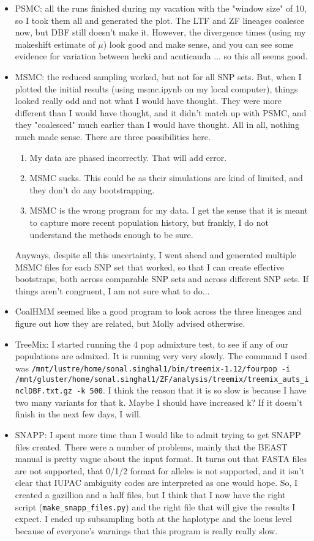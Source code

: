 \documentclass[idxtotoc,hyperref,openany,oneside]{labbook} %
\begin{document}
\begin{itemize}
\item PSMC: all the runs finished during my vacation with the "window size" of 10, so I took them all and generated the plot. The LTF and ZF lineages coalesce now, but DBF still doesn't make it. However, the divergence times (using my makeshift estimate of $\mu$) look good and make sense, and you can see some evidence for variation between hecki and acuticauda ... so this all seems good.
\item MSMC: the reduced sampling worked, but not for all SNP sets. But, when I plotted the initial results (using msmc.ipynb on my local computer), things looked really odd and not what I would have thought. They were more different than I would have thought, and it didn't match up with PSMC, and they "coalesced" much earlier than I would have thought. All in all, nothing much made sense. There are three possibilities here.
\begin{enumerate}
\item My data are phased incorrectly. That will add error.
\item MSMC sucks. This could be as their simulations are kind of limited, and they don't do any bootstrapping.
\item MSMC is the wrong program for my data. I get the sense that it is meant to capture more recent population history, but frankly, I do not understand the methods enough to be sure.
\end{enumerate}
Anyways, despite all this uncertainty, I went ahead and generated multiple MSMC files for each SNP set that worked, so that I can create effective bootstraps, both across comparable SNP sets and across different SNP sets. If things aren't congruent, I am not sure what to do...
\item CoalHMM seemed like a good program to look across the three lineages and figure out how they are related, but Molly advised otherwise.
\item TreeMix: I started running the 4 pop admixture test, to see if any of our populations are admixed. It is running very very slowly. The command I used was \verb+/mnt/lustre/home/sonal.singhal1/bin/treemix-1.12/fourpop -i /mnt/gluster/home/sonal.singhal1/ZF/analysis/treemix/treemix_auts_inclDBF.txt.gz -k 500+. I think the reason that it is so slow is because I have two many variants for that k. Maybe I should have increased k? If it doesn't finish in the next few days, I will.
\item SNAPP: I spent more time than I would like to admit trying to get SNAPP files created. There were a number of problems, mainly that the BEAST manual is pretty vague about the input format. It turns out that FASTA files are not supported, that 0/1/2 format for alleles is not supported, and it isn't clear that IUPAC ambiguity codes are interpreted as one would hope. So, I created a gazillion and a half files, but I think that I now have the right script (\verb+make_snapp_files.py+) and the right file that will give the results I expect. I ended up subsampling both at the haplotype and the locus level because of everyone's warnings that this program is really really slow.

\end{itemize}
\end{document}
